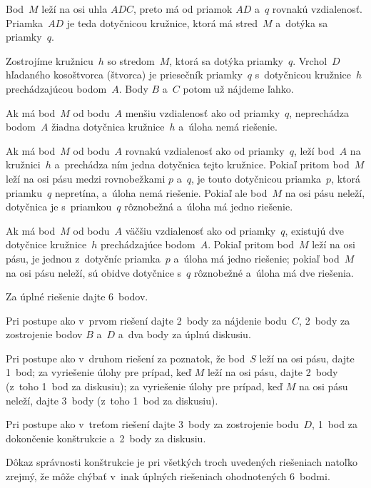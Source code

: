 {\ineriesenie
Bod~$M$ leží na osi uhla $ADC$, preto má od priamok $AD$ a~$q$ rovnakú vzdialenosť. Priamka~$AD$ je teda dotyčnicou kružnice, ktorá má stred~$M$ a~dotýka sa priamky~$q$.

\konstrukcia
Zostrojíme kružnicu~$h$ so stredom~$M$, ktorá sa dotýka priamky~$q$. Vrchol~$D$ hľadaného kosoštvorca (štvorca) je priesečník priamky~$q$ s~dotyčnicou kružnice~$h$ prechádzajúcou bodom~$A$. Body $B$ a~$C$ potom už nájdeme ľahko.

\diskusia
Ak má bod~$M$ od bodu~$A$ menšiu vzdialenosť ako od priamky~$q$, neprechádza bodom~$A$ žiadna dotyčnica kružnice~$h$ a~úloha nemá riešenie.

Ak má bod~$M$ od bodu~$A$ rovnakú vzdialenosť ako od priamky~$q$, leží bod~$A$ na kružnici~$h$ a~prechádza ním jedna dotyčnica tejto kružnice. Pokiaľ pritom bod~$M$ leží na osi pásu medzi rovnobežkami $p$ a~$q$, je touto dotyčnicou priamka~$p$, ktorá priamku~$q$ nepretína, a~úloha nemá riešenie. Pokiaľ ale bod~$M$ na osi pásu neleží, dotyčnica je s~priamkou~$q$ rôznobežná a~úloha má jedno riešenie.

Ak má bod~$M$ od bodu~$A$ väčšiu vzdialenosť ako od priamky~$q$, existujú dve dotyčnice kružnice~$h$ prechádzajúce bodom~$A$. Pokiaľ pritom bod~$M$ leží na osi pásu, je jednou z~dotyčníc priamka~$p$ a~úloha má jedno riešenie; pokiaľ bod~$M$ na osi pásu neleží, sú obidve dotyčnice s~$q$ rôznobežné a~úloha má dve riešenia.

\bigskip\petit\noindent
Za úplné riešenie dajte 6~bodov.

Pri postupe ako v~prvom riešení dajte 2~body za nájdenie bodu~$C$, 2~body za zostrojenie bodov $B$ a~$D$ a~dva body za úplnú diskusiu.

Pri postupe ako v~druhom riešení za poznatok, že bod~$S$ leží na osi pásu, dajte 1~bod; za vyriešenie úlohy pre prípad, keď $M$ leží na osi pásu, dajte 2~body (z~toho 1~bod za diskusiu); za vyriešenie úlohy pre prípad, keď $M$ na osi pásu neleží, dajte 3~body (z~toho 1~bod za diskusiu).

Pri postupe ako v~treťom riešení dajte 3~body za zostrojenie bodu~$D$, 1~bod za dokončenie konštrukcie a~2~body za diskusiu.

Dôkaz správnosti konštrukcie je pri všetkých troch uvedených riešeniach natoľko zrejmý, že môže chýbať v~inak úplných riešeniach ohodnotených 6~bodmi.
\endpetit}

